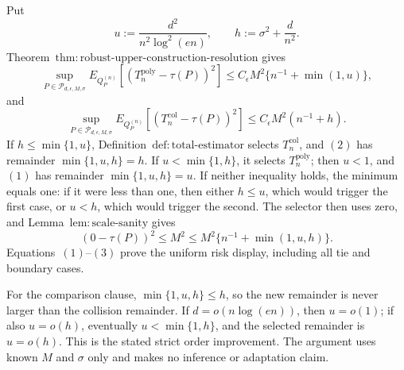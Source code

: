 Put
\[
 u:=\frac{d^2}{n^2\log^2(en)},\qquad h:=\sigma^2+\frac d{n^2}.
\]
Theorem~\(\mathrm{thm:robust\text{-}upper\text{-}construction\text{-}resolution}\) gives
\[
 \sup_{P\in\mathcal P_{d,\epsilon,M,\sigma}}
 E_{Q_P^{(n)}}[(T_n^{\mathrm{poly}}-\tau(P))^2]
 \le C_\epsilon M^2\{n^{-1}+\min(1,u)\},
\tag{1}
\]
and
\[
 \sup_{P\in\mathcal P_{d,\epsilon,M,\sigma}}
 E_{Q_P^{(n)}}[(T_n^{\mathrm{col}}-\tau(P))^2]
 \le C_\epsilon M^2(n^{-1}+h).
\tag{2}
\]
If \(h\le\min\{1,u\}\), Definition~\(\mathrm{def:total\text{-}estimator}\) selects \(T_n^{\mathrm{col}}\), and \((2)\) has remainder \(\min\{1,u,h\}=h\).  If \(u<\min\{1,h\}\), it selects \(T_n^{\mathrm{poly}}\); then \(u<1\), and \((1)\) has remainder \(\min\{1,u,h\}=u\).  If neither inequality holds, the minimum equals one: if it were less than one, then either \(h\le u\), which would trigger the first case, or \(u<h\), which would trigger the second.  The selector then uses zero, and Lemma~\(\mathrm{lem:scale\text{-}sanity}\) gives
\[
 (0-\tau(P))^2\le M^2
 \le M^2\{n^{-1}+\min(1,u,h)\}.
\tag{3}
\]
Equations~\((1)\)--\((3)\) prove the uniform risk display, including all tie and boundary cases.

For the comparison clause, \(\min\{1,u,h\}\le h\), so the new remainder is never larger than the collision remainder.  If \(d=o(n\log(en))\), then \(u=o(1)\); if also \(u=o(h)\), eventually \(u<\min\{1,h\}\), and the selected remainder is \(u=o(h)\).  This is the stated strict order improvement.  The argument uses known \(M\) and \(\sigma\) only and makes no inference or adaptation claim.